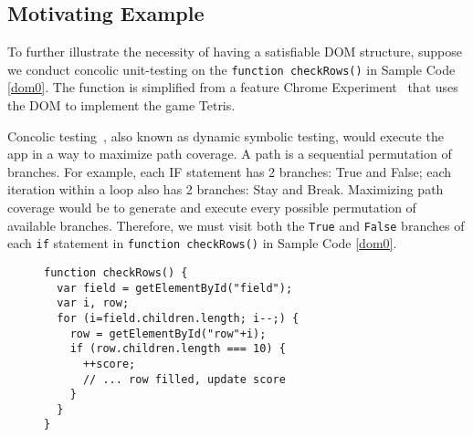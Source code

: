\subsection{Motivating Example}
To further illustrate the necessity of having a satisfiable DOM structure, suppose we conduct concolic unit-testing on the {\tt function checkRows()} in Sample Code~ \ref{dom0}.  
The function is simplified from a feature Chrome Experiment~\cite{domtris} that uses the DOM to implement the game Tetris.  

Concolic testing~\cite{cute}, also known as dynamic symbolic testing, would execute the app in a way to maximize path coverage.
A path is a sequential permutation of branches.  For example, each IF statement has 2 branches: True and False; each iteration within a loop also has 2 branches: Stay and Break.  
Maximizing path coverage would be to generate and execute every possible permutation of available branches.  
Therefore, we must visit both the {\tt True} and {\tt False} branches of each {\tt if} statement in {\tt function checkRows()} in Sample Code \ref{dom0}.
\begin{figure}
\begin{lstlisting}[caption=Example code whose tests and execution depend on the Document Object Model having a precise tree structure. {\tt getElementById()} is equivalent to {\tt document.getElementById()}.,label=dom0]
function checkRows() {
  var field = getElementById("field"); 
  var i, row;
  for (i=field.children.length; i--;) {
    row = getElementById("row"+i);
    if (row.children.length === 10) {
      ++score;
      // ... row filled, update score
    }
  }
}
\end{lstlisting}
\end{figure}

